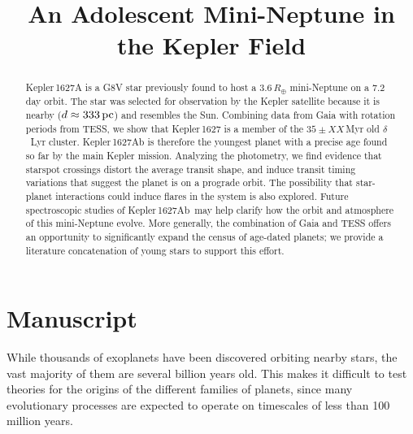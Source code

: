 \documentclass[12pt,modern,tighten]{aastex63}
\newcommand{\pn}{Kepler\,1627Ab} %
\begin{document}

\title{
  An Adolescent Mini-Neptune in the Kepler Field
}



\begin{abstract}
  Kepler\,1627A is a G8V star previously found to host a
  $3.6\,R_\oplus$ mini-Neptune on a 7.2\,day orbit.  The star was
  selected for observation by the Kepler satellite because it is
  nearby ($d\approx 333\,{\rm pc}$) and resembles the Sun.  Combining
  data from Gaia with rotation periods from TESS, we show that
  Kepler\,1627 is a member of the $35\pm XX$\,Myr old $\delta$~Lyr
  cluster.  Kepler\,1627Ab is therefore the youngest planet with a
  precise age found so far by the main Kepler mission.
  Analyzing the photometry, we find evidence that starspot crossings
  distort the average transit shape, and induce transit timing
  variations that suggest the planet is on a prograde orbit.  The
  possibility that star-planet interactions could induce
  flares in the system is also explored.  Future spectroscopic studies
  of \pn\ may help clarify how the orbit and atmosphere of this
  mini-Neptune evolve.  More generally, the combination of Gaia and TESS
  offers an opportunity to significantly expand the census of
  age-dated planets; we provide a literature concatenation of young
  stars to support this effort.
\end{abstract}




\section{Manuscript}

While thousands of exoplanets have been discovered orbiting nearby
stars, the vast majority of them are several billion years old.  This
makes it difficult to test theories for the origins of the different
families of planets, since many evolutionary processes are expected to
operate on timescales of less than 100 million years.
\end{document}

